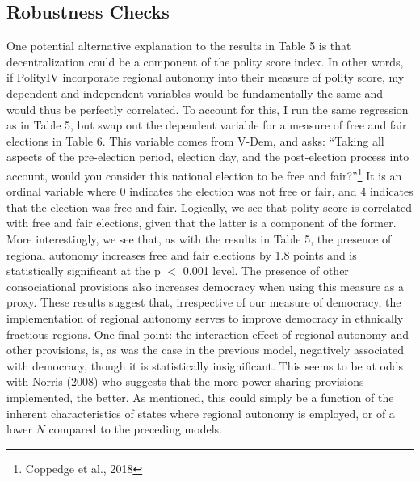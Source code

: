 \documentclass[12pt]{article}
\begin{document}
\subsection{Robustness Checks}
One potential alternative explanation to the results in Table 5 is that decentralization could be a component of the polity score index. In other words, if PolityIV incorporate regional autonomy into their measure of polity score, my dependent and independent variables would be fundamentally the same and would thus be perfectly correlated. To account for this, I run the same regression as in Table 5, but swap out the dependent variable for a measure of free and fair elections in Table 6. This variable comes from V-Dem, and asks: ``Taking all aspects of the pre-election period, election day, and the post-election process into account, would you consider this national election to be free and fair?''\footnote{Coppedge et al., 2018} It is an ordinal variable where 0 indicates the election was not free or fair, and 4 indicates that the election was free and fair. Logically, we see that polity score is correlated with free and fair elections, given that the latter is a component of the former. More interestingly, we see that, as with the results in Table 5, the presence of regional autonomy increases free and fair elections by 1.8 points and is statistically significant at the p $<$ 0.001 level. The presence of other consociational provisions also increases democracy when using this measure as a proxy. These results suggest that, irrespective of our measure of democracy, the implementation of regional autonomy serves to improve democracy in ethnically fractious regions. One final point: the interaction effect of regional autonomy and other provisions, is, as was the case in the previous model, negatively associated with democracy, though it is statistically insignificant. This seems to be at odds with Norris (2008) who suggests that the more power-sharing provisions implemented, the better. As mentioned, this could simply be a function of the inherent characteristics of states where regional autonomy is employed, or of a lower $N$ compared to the preceding models.  
\end{document}
